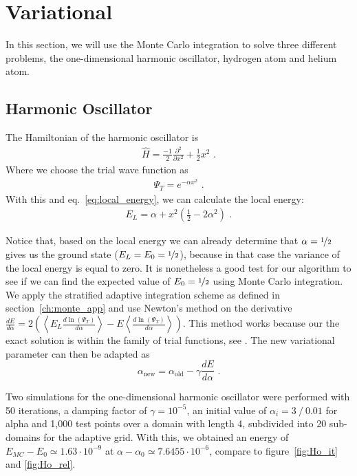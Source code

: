 
\section{Variational}
In this section, we will use the Monte Carlo integration to solve three different problems, the one-dimensional harmonic oscillator, hydrogen atom and helium atom.

\subsection{Harmonic Oscillator}
The Hamiltonian of the harmonic oscillator is
\begin{align*}
	\hat{H} = \frac{-1}{2}\frac{\partial^2}{ \partial x^2} + \frac{1}{2} x^2  \text{~.}
\end{align*}
Where we choose the trial wave function as
\begin{align*}
	\Psi_T = e^{-\alpha x^2} \text{~.}
\end{align*}
With this and eq.~\eqref{eq:local_energy}, we can calculate the local energy:
\begin{align*}
	E_L = \alpha + x^2 \left(\frac{1}{2} - 2\alpha^2\right) \text{~.}
\end{align*}
 	
Notice that, based on the local energy we can already determine that $\alpha = \nicefrac{1}{2}$ gives us the ground state ($E_L = E_0 = \nicefrac{1}{2}$), because in that case the variance of the local energy is equal to zero. It is nonetheless a good test for our algorithm to see if we can find the expected value of $E_0 = \nicefrac{1}{2}$ using Monte Carlo integration.\\
  
We apply the stratified adaptive integration scheme as defined in section~\ref{ch:monte_app} and use Newton's method on the derivative $\frac{dE}{d\alpha} = 2 (\left< E_L \frac{d \ln(\Psi_T)}{d \alpha} \right> - E\left<\frac{d \ln(\Psi_T)}{d \alpha}\right>)$. This method works because our the exact solution is within the family of trial functions, see \cite{JosBook}. %
The new variational parameter can then be adapted as $$\alpha_{\text{new}} = \alpha_{\text{old}} - \gamma \frac{dE}{d\alpha} \text{~.} $$

Two simulations for the one-dimensional harmonic oscillator were performed with 50 iterations, a damping factor of $\gamma = 10^{-5}$, an initial value of $\alpha_i = 3~/~ 0.01$ for alpha and 1,000 test points over a domain with length 4, subdivided into 20 sub-domains for the adaptive grid. With this, we obtained an energy of $E_{MC}-E_0 \simeq 1.63\cdot 10^{-9}$ at $\alpha - \alpha_0 \simeq 7.6455\cdot 10^{-6}$, compare to figure~\ref{fig:Ho_it} and \ref{fig:Ho_rel}.

